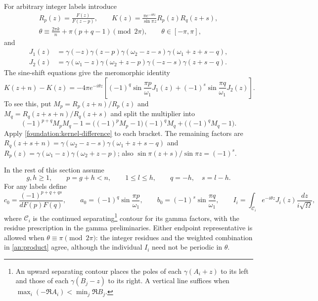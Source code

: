 \documentclass[11pt]{article}
\numberwithin{equation}{section}
\theoremstyle{definition}
\theoremstyle{remark}
\begin{document}
For arbitrary integer labels introduce
\begin{gather*}
 R_p(z)=\frac{F(z)}{F(z-p)},\qquad
 K(z)=\frac{\pi e^{-i\theta z}}{\sin\pi z}R_p(z)R_q(z+s),\\
 \theta\equiv\frac{2\pi k}{n}+\pi(p+q-1)\pmod{2\pi},\qquad
 \theta\in[-\pi,\pi],
\end{gather*}
and
\begin{align*}
 J_1(z)&=\gamma(-z)\gamma(z-p)
                   \gamma(\omega_2-z-s)\gamma(\omega_1+z+s-q),\\
 J_2(z)&=\gamma(\omega_1-z)\gamma(\omega_2+z-p)
                   \gamma(-z-s)\gamma(z+s-q).
\end{align*}
The sine-shift equations give the meromorphic identity
\begin{equation}
 K(z+n)-K(z)=-4\pi e^{-i\theta z}
 \left[(-1)^q\sin\frac{\pi p}{\omega_1}J_1(z)
       +(-1)^s\sin\frac{\pi q}{\omega_1}J_2(z)\right].
 \label{an:two-ratio}
\end{equation}
To see this, put $M_p=R_p(z+n)/R_p(z)$ and
$M_q=R_q(z+s+n)/R_q(z+s)$ and split the multiplier into
\[
 (-1)^{p+q}M_pM_q-1
 =\bigl((-1)^pM_p-1\bigr)(-1)^qM_q+
                                      \bigl((-1)^qM_q-1\bigr).
\]
Apply \eqref{foundation:kernel-difference}
to each bracket.  The remaining factors are
$R_q(z+s+n)=\gamma(\omega_2-z-s)\gamma(\omega_1+z+s-q)$ and
$R_p(z)=\gamma(\omega_1-z)\gamma(\omega_2+z-p)$; also
$\sin\pi(z+s)/\sin\pi z=(-1)^s$.

In the rest of this section assume
\begin{equation}
 g,h\ge1,\qquad p=g+h<n,\qquad 1\le l\le h,
 \qquad q=-h,\quad s=l-h.
 \label{an:ordered}
\end{equation}
For any labels define
\[
 c_0=\frac{(-1)^{p+q+qs}}{dF(p)F(q)},\qquad
 a_0=(-1)^q\sin\frac{\pi p}{\omega_1},\qquad
 b_0=(-1)^s\sin\frac{\pi q}{\omega_1},\qquad
 I_i=\int_{\mathcal C_i}e^{-i\theta z}J_i(z)
                                    \frac{dz}{i\sqrt\Omega},
\]
where $\mathcal C_i$ is the continued separating\footnote{An upward separating contour places the poles of each $\gamma(A_i+z)$ to its left and those of each $\gamma(B_j-z)$ to its right. A vertical line suffices when $\max_i(-\Re A_i)<\min_j\Re B_j$.}
contour for its gamma factors, with the residue prescription in the
gamma preliminaries.  Either endpoint representative is allowed when
$\theta\equiv\pi\pmod{2\pi}$: the integer residues and the weighted
combination in \eqref{an:product} agree, although the individual $I_i$
need not be periodic in $\theta$.
\end{document}
